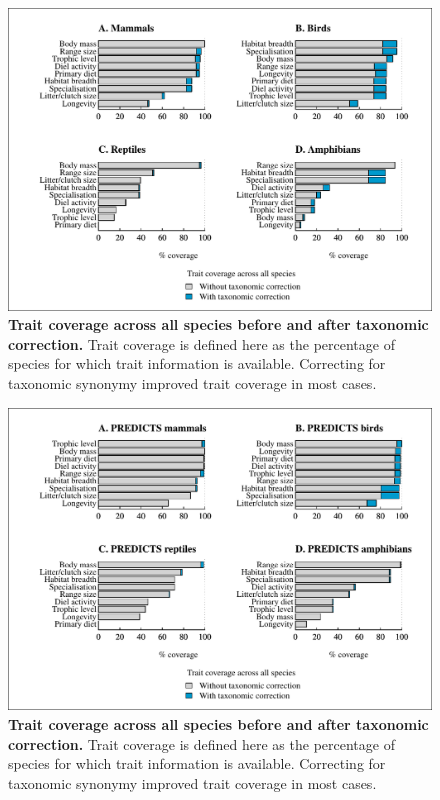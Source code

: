 \begin{figure}[h!]
\centering
\includegraphics[scale=0.85]{figures/chapter2/Target_traits_All_species_coverage}
\caption[Trait coverage across all species before and after taxonomic correction]{\textbf{Trait coverage across all species before and after taxonomic correction.} Trait coverage is defined here as the percentage of species for which trait information is available. Correcting for taxonomic synonymy improved trait coverage in most cases.}
\end{figure}

\begin{figure}[h!]
\centering
\includegraphics[scale=0.85]{figures/chapter2/Target_traits_Predicts_species_coverage}
\caption[Trait coverage across PREDICTS species before and after taxonomic correction]{\textbf{Trait coverage across all species before and after taxonomic correction.} Trait coverage is defined here as the percentage of species for which trait information is available. Correcting for taxonomic synonymy improved trait coverage in most cases.}
\end{figure}


